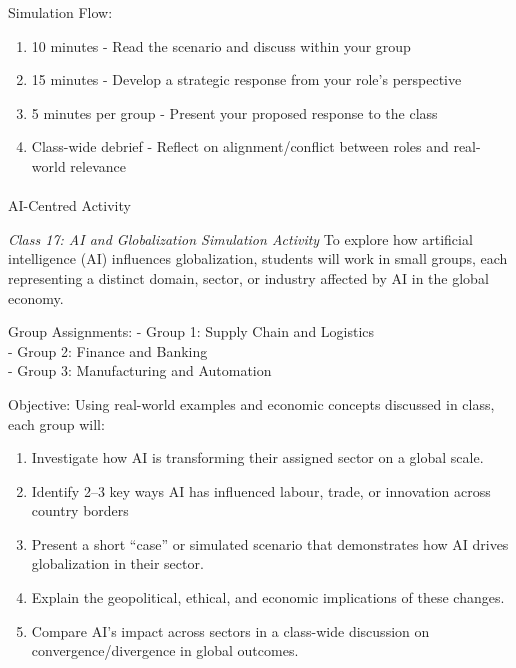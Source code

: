 \documentclass[
  11pt,
]{article}
\makeatletter
\let\oldparagraph\paragraph
\renewcommand{\paragraph}{
    \@ifstar
      \xxxParagraphStar
      \xxxParagraphNoStar
  }
\newcommand{\xxxParagraphStar}[1]{\oldparagraph*{#1}\mbox{}}
\newcommand{\xxxParagraphNoStar}[1]{\oldparagraph{#1}\mbox{}}
\providecommand{\tightlist}{%
  \setlength{\itemsep}{0pt}\setlength{\parskip}{0pt}}
\makeatother
\begin{document}
Simulation Flow:

\begin{enumerate}
\def\labelenumi{\arabic{enumi}.}
\tightlist
\item
  10 minutes - Read the scenario and discuss within your group
\item
  15 minutes - Develop a strategic response from your role's perspective
\item
  5 minutes per group - Present your proposed response to the class
\item
  Class-wide debrief - Reflect on alignment/conflict between roles and
  real-world relevance
\end{enumerate}

\paragraph{AI-Centred Activity}\label{ai-centred-activity}

\emph{Class 17: AI and Globalization Simulation Activity} To explore how
artificial intelligence (AI) influences globalization, students will
work in small groups, each representing a distinct domain, sector, or
industry affected by AI in the global economy.

Group Assignments: - Group 1: Supply Chain and Logistics\\
- Group 2: Finance and Banking\\
- Group 3: Manufacturing and Automation

Objective: Using real-world examples and economic concepts discussed in
class, each group will:

\begin{enumerate}
\def\labelenumi{\arabic{enumi}.}
\tightlist
\item
  Investigate how AI is transforming their assigned sector on a global
  scale.
\item
  Identify 2--3 key ways AI has influenced labour, trade, or innovation
  across country borders
\item
  Present a short ``case'' or simulated scenario that demonstrates how
  AI drives globalization in their sector.
\item
  Explain the geopolitical, ethical, and economic implications of these
  changes.
\item
  Compare AI's impact across sectors in a class-wide discussion on
  convergence/divergence in global outcomes.
\end{enumerate}
\end{document}
